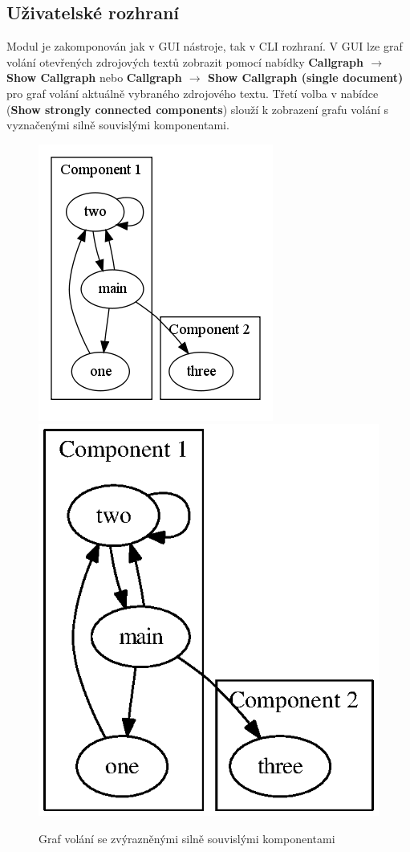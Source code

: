 \documentclass[11pt,final,oneside]{fithesis}
\begin{document}
\subsection{Uživatelské rozhraní}
Modul je zakomponován jak v GUI nástroje, tak v CLI rozhraní. V GUI lze graf volání otevřených zdrojových textů zobrazit pomocí nabídky \textbf{Callgraph $\rightarrow$ Show Callgraph} nebo \textbf{Callgraph $\rightarrow$ Show Callgraph (single document)} pro graf volání aktuálně vybraného zdrojového textu. Třetí volba v nabídce (\textbf{Show strongly connected components}) slouží k zobrazení grafu volání s vyznačenými silně souvislými komponentami.

\begin{figure}[ht]
\begin{center}
\ifpdf
	\includegraphics[scale=0.5]{img/normal.png}
\else
	\includegraphics{img/normal.ps}
\fi
\end{center}
\caption{Graf volání se zvýrazněnými silně souvislými komponentami}
\label{normal-img}
\end{figure}
\end{document}
